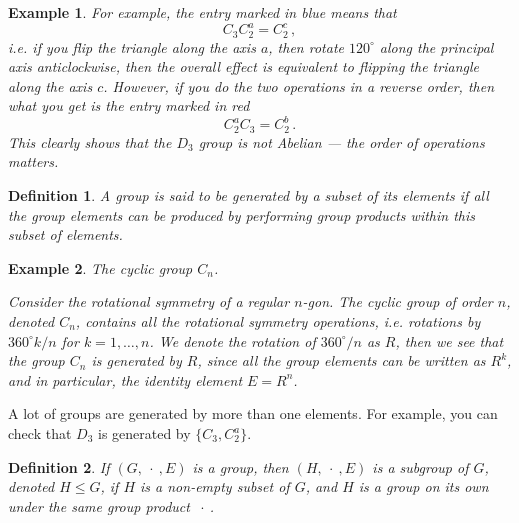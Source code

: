 \documentclass{article}
\theoremstyle{plain}\theoremheaderfont{\normalfont\itshape}\theorembodyfont{\rmfamily}\theoremseparator{.}\newtheorem*{rem}{Remark}\newtheorem*{ex}{Example}\newtheorem*{proof}{Proof}\newtheorem*{altp}{Alternative proof}
\theoremstyle{plain}\theoremheaderfont{\normalfont\bfseries}\theorembodyfont{\rmfamily}\theoremseparator{.}\newtheorem{thm}{Theorem}[section]\newtheorem{lem}[thm]{Lemma}\newtheorem{prop}[thm]{Proposition}\newtheorem*{cor}{Corollary}\newtheorem{defn}[thm]{Definition}\newtheorem{clm}[thm]{Claim}\newtheorem{clminproof}{Claim}\newtheorem*{law}{Law}\newtheorem{pos}[thm]{Postulate}
\theoremstyle{break}\theoremheaderfont{\normalfont\itshape}\theorembodyfont{\rmfamily}\theoremseparator{.\medskip}\newtheorem*{proofskip}{Proof}\newtheorem*{exs}{Examples}\newtheorem*{rems}{Remarks}
\theoremstyle{break}\theoremheaderfont{\normalfont\bfseries}\theorembodyfont{\rmfamily}\theoremseparator{.\medskip}\newtheorem{lemskip}[thm]{Lemma}\newtheorem{defnskip}[thm]{Definition}\newtheorem{propskip}[thm]{Proposition}\newtheorem{thmskip}[thm]{Theorem}
\numberwithin{equation}{section}
\begin{document}
\begin{ex}
        For example, the entry marked in blue means that
        \begin{equation}
            C_3 C_2^a=C_2^c\,,
        \end{equation}
        i.e. if you flip the triangle along the axis \(a\), then rotate \(120^\circ\) along the principal axis anticlockwise, then the overall effect is equivalent to flipping the triangle along the axis \(c\). However, if you do the two operations in a reverse order, then what you get is the entry marked in red
        \begin{equation}
            C_2^a C_3=C_2^b\,.
        \end{equation}
        This clearly shows that the \(D_3\) group is not Abelian --- the order of operations matters.
    \end{ex}

    \begin{defn}
        A group is said to be \textit{generated} by a subset of its elements if all the group elements can be produced by performing group products within this subset of elements.
    \end{defn}
    \begin{ex}
        \textit{The cyclic group \(C_n\).}

        Consider the rotational symmetry of a regular \(n\)-gon. The cyclic group of order \(n\), denoted \(C_n\), contains all the rotational symmetry operations, i.e. rotations by \(360^\circ k/n\) for \(k=1,\dots, n\). We denote the rotation of \(360^\circ/n\) as \(R\), then we see that the group \(C_n\) is generated by \(R\), since all the group elements can be written as \(R^k\), and in particular, the identity element \(E=R^n\).
    \end{ex}

    A lot of groups are generated by more than one elements. For example, you can check that \(D_3\) is generated by \(\{C_3,C_2^a\}\).

    \begin{defn}
        If \((G,\ \cdot\ , E)\) is a group, then \((H,\ \cdot\ , E)\) is a \textit{subgroup} of \(G\), denoted \(H\le G\), if \(H\) is a non-empty subset of \(G\), and \(H\) is a group on its own under the same group product \(\ \cdot\ \).
    \end{defn}
\end{document}
